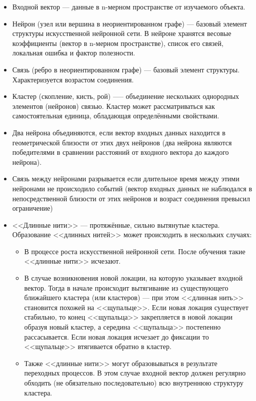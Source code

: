\documentclass[unicode, 12pt, a4paper,oneside,fleqn]{article}
\begin{document}
\begin{itemize}
\item Входной вектор --- данные в n-мерном пространстве от изучаемого
  объекта.
\item Нейрон (узел или вершина в неориентированном графе) --- базовый
  элемент структуры искусственной нейронной сети. В нейроне хранятся
  весовые коэффициенты (вектор в n-мерном пространстве), список его
  связей, локальная ошибка и фактор полезности.
\item Связь (ребро в неориентированном графе) --- базовый элемент
  структуры. Характеризуется возрастом соединения.
\item Кластер (скопление, кисть, рой) --— объединение нескольких
  однородных элементов (нейронов) связью. Кластер может рассматриваться как
  самостоятельная единица, обладающая определёнными свойствами.
\item Два нейрона объединяются, если вектор входных данных находится в
  геометрической близости от этих двух нейронов (два нейрона являются
  победителями в сравнении расстояний от входного вектора до каждого
  нейрона).
\item Связь между нейронами разрывается если длительное время между
  этими нейронами не происходило событий (вектор входных данных не
  наблюдался в непосредственной близости от этих нейронов и возраст
  соединения превысил ограничение)
\item <<Длинные нити>> --- протяжённые, сильно вытянутые кластера.
  Образование <<длинных нитей>> может происходить в нескольких случаях:
  \begin{itemize}
  \item В процессе роста искусственной нейронной сети. После обучения
    такие <<длинные нити>> исчезают.
  \item В случае возникновения новой локации, на которую указывает
    входной вектор. Тогда в начале происходит вытягивание из
    существующего ближайшего кластера (или кластеров) --- при этом
    <<длинная нить>> становится похожей на <<щупальце>>. Если новая
    локация существует стабильно, то конец <<щупальца>> закрепляется в
    новой локации образуя новый кластер, а середина <<щупальца>>
    постепенно рассасывается. Если новая локация исчезает до фиксации
    то <<щупальце>> втягивается обратно в кластер.
  \item Также <<длинные нити>> могут образовываться в результате
    переходных процессов. В этом случае входной вектор должен
    регулярно обходить (не обязательно последовательно) всю внутреннюю
    структуру кластера.
  \end{itemize}
\end{itemize}
\end{document}
